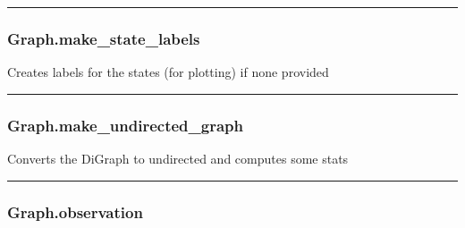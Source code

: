 \begin{center}\rule{0.5\linewidth}{\linethickness}\end{center}

\subsubsection{Graph.make\_state\_labels}\label{graph.make_state_labels}

\begin{Shaded}
\begin{Highlighting}[]
\NormalTok{)}
\end{Highlighting}
\end{Shaded}

Creates labels for the states (for plotting) if none provided

\begin{center}\rule{0.5\linewidth}{\linethickness}\end{center}

\subsubsection{Graph.make\_undirected\_graph}\label{graph.make_undirected_graph}

\begin{Shaded}
\begin{Highlighting}[]
\NormalTok{)}
\end{Highlighting}
\end{Shaded}

Converts the DiGraph to undirected and computes some stats

\begin{center}\rule{0.5\linewidth}{\linethickness}\end{center}

\subsubsection{Graph.observation}\label{graph.observation}

\begin{Shaded}
\begin{Highlighting}[]
\NormalTok{)}
\end{Highlighting}
\end{Shaded}

